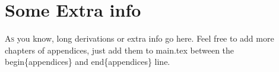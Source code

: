 \chapter{Some Extra info}
\label{app-a} %
\lettrine[lines=1]{A}{s} you know, long derivations or extra info go here. Feel free to add more chapters of appendices, just add them to main.tex between the begin\{appendices\} and end\{appendices\} line.